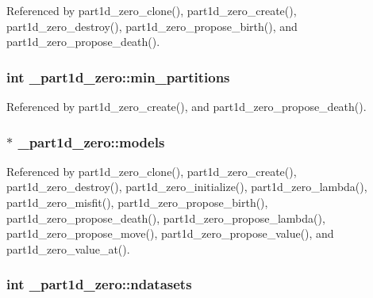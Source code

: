 Referenced by part1d\+\_\+zero\+\_\+clone(), part1d\+\_\+zero\+\_\+create(), part1d\+\_\+zero\+\_\+destroy(), part1d\+\_\+zero\+\_\+propose\+\_\+birth(), and part1d\+\_\+zero\+\_\+propose\+\_\+death().

\subsubsection[{\texorpdfstring{min\+\_\+partitions}{min_partitions}}]{\setlength{\rightskip}{0pt plus 5cm}int \+\_\+part1d\+\_\+zero\+::min\+\_\+partitions}\hypertarget{struct__part1d__zero_a574be34a06cb790979fae4ab31cb6160}{}\label{struct__part1d__zero_a574be34a06cb790979fae4ab31cb6160}


Referenced by part1d\+\_\+zero\+\_\+create(), and part1d\+\_\+zero\+\_\+propose\+\_\+death().

\subsubsection[{\texorpdfstring{models}{models}}]{$\ast$ \+\_\+part1d\+\_\+zero\+::models}\hypertarget{struct__part1d__zero_a31120b620786ea66e282a6b41c23e672}{}\label{struct__part1d__zero_a31120b620786ea66e282a6b41c23e672}


Referenced by part1d\+\_\+zero\+\_\+clone(), part1d\+\_\+zero\+\_\+create(), part1d\+\_\+zero\+\_\+destroy(), part1d\+\_\+zero\+\_\+initialize(), part1d\+\_\+zero\+\_\+lambda(), part1d\+\_\+zero\+\_\+misfit(), part1d\+\_\+zero\+\_\+propose\+\_\+birth(), part1d\+\_\+zero\+\_\+propose\+\_\+death(), part1d\+\_\+zero\+\_\+propose\+\_\+lambda(), part1d\+\_\+zero\+\_\+propose\+\_\+move(), part1d\+\_\+zero\+\_\+propose\+\_\+value(), and part1d\+\_\+zero\+\_\+value\+\_\+at().

\subsubsection[{\texorpdfstring{ndatasets}{ndatasets}}]{\setlength{\rightskip}{0pt plus 5cm}int \+\_\+part1d\+\_\+zero\+::ndatasets}\hypertarget{struct__part1d__zero_a96fbc5c54cb93b575d0b11d974cb4b5b}{}\label{struct__part1d__zero_a96fbc5c54cb93b575d0b11d974cb4b5b}


